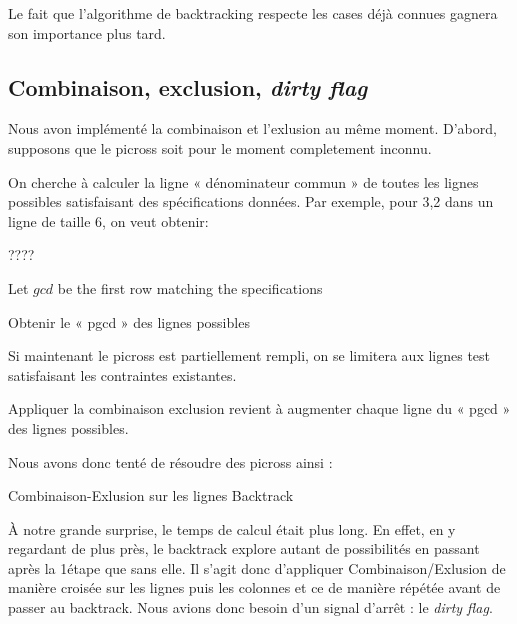 Le fait que l'algorithme de backtracking respecte les cases déjà connues gagnera son importance plus tard.

\subsection{Combinaison, exclusion, \emph{dirty flag}}

Nous avon implémenté la combinaison et l'exlusion au même moment. D'abord, supposons que le picross soit pour le moment completement inconnu.

On cherche à calculer la ligne « dénominateur commun » de toutes les lignes possibles satisfaisant des spécifications données. Par exemple, pour 3,2 dans un ligne de taille 6, on veut obtenir:


\begin{center}
?\SquareSolid??\SquareSolid?
\end{center}

\begin{algorithm}[H]
Let $gcd$ be the first row matching the specifications \;
 \caption{Obtenir le « pgcd » des lignes possibles}
 \end{algorithm}

 Si maintenant le picross est partiellement rempli, on se limitera aux lignes test satisfaisant les contraintes existantes.

Appliquer la combinaison exclusion revient à augmenter chaque ligne du « pgcd » des lignes possibles.

Nous avons donc tenté de résoudre des picross ainsi : 
\begin{algorithm}[H]
    Combinaison-Exlusion sur les lignes\;
    Backtrack\;
\end{algorithm}

À notre grande surprise, le temps de calcul était plus long. En effet, en y regardant de plus près, le backtrack explore autant de possibilités en passant après la 1\iere étape que sans elle. Il s'agit donc d'appliquer Combinaison/Exlusion de manière croisée sur les lignes puis les colonnes et ce de manière répétée avant de passer au backtrack. Nous avions donc besoin d'un signal d'arrêt : le \emph{dirty flag}.

